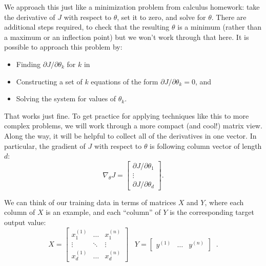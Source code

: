 We approach this just like a minimization problem from calculus
homework:  take the derivative of $J$ with respect to $\theta$, set it
to zero, and solve for $\theta$.  There are additional steps
required, to check that the resulting $\theta$ is a minimum (rather
than a maximum or an inflection point) but we won't work through that
here.   It is possible to approach this problem by:
\begin{itemize}
  \item Finding $\partial{J}/\partial{\theta_k}$ for $k$ in
  \item Constructing a set of $k$ equations of the form
        $\partial{J}/\partial{\theta_k} = 0$, and
  \item Solving the system for values of $\theta_k$.
\end{itemize}
That works just fine.  To get practice for applying techniques like
this to more complex problems, we will work through a more compact
(and cool!) matrix view. Along the way, it will be helpful to collect all of the derivatives in one
vector. In particular,
the
gradient of $J$ with respect to $\theta$ is following column vector of length $d$:
\[
  \nabla_\theta J =
  \begin{bmatrix}
    \partial J / \partial \theta_1 \\
    \vdots                         \\
    \partial J / \partial \theta_d
  \end{bmatrix}.
\]


We can think of our training data in terms of matrices $X$ and $Y$,
where each column of $X$ is an example, and each ``column'' of $Y$ is
the corresponding target output value:
\begin{equation*}
  X = \begin{bmatrix}x_1^{(1)} & \dots & x_1^{(n)} \\\vdots & \ddots &
               \vdots                        \\x_d^{(1)} & \dots & x_d^{(n)}\end{bmatrix} \;\;\;
  Y = \begin{bmatrix}y^{(1)} & \dots & y^{(n)}\end{bmatrix}\;\;.
\end{equation*}


